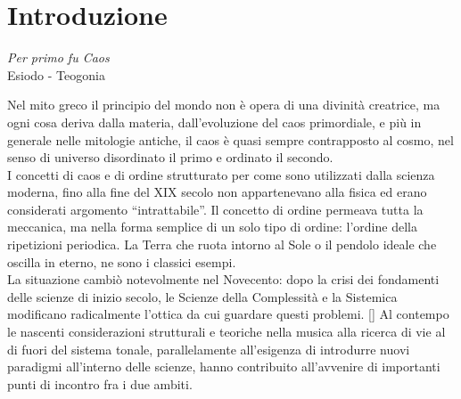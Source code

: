 \section{Introduzione}
\label{sec:Introduzione}

\begin{center}
\vspace{0.5cm}
\textit{Per primo fu Caos}
\\
Esiodo - Teogonia
\vspace{0.5cm}
\end{center}

Nel mito greco il principio del mondo non è opera di una divinità creatrice,
ma ogni cosa deriva dalla materia, dall’evoluzione del caos primordiale,
e più in generale nelle mitologie antiche, il caos è quasi sempre
contrapposto al cosmo, nel senso di universo disordinato il primo e ordinato
il secondo. \\
I concetti di caos e di ordine strutturato per come sono utilizzati dalla scienza moderna, fino alla fine del XIX secolo non appartenevano alla fisica ed erano considerati argomento “intrattabile”.
Il concetto di ordine permeava tutta la meccanica,
ma nella forma semplice di un solo tipo di ordine: l’ordine della ripetizioni periodica.
La Terra che ruota intorno al Sole o il pendolo ideale che oscilla in eterno, ne sono i classici esempi. \\
La situazione cambiò notevolmente nel Novecento:
dopo la crisi dei fondamenti delle scienze di inizio secolo,
le Scienze della Complessità e la Sistemica modificano radicalmente l’ottica da cui guardare questi problemi. [\cite{caosvillani}]
Al contempo le nascenti considerazioni strutturali e teoriche
nella musica alla ricerca di vie al di fuori del sistema tonale,
parallelamente all'esigenza di introdurre nuovi paradigmi all'interno delle scienze,
hanno contribuito all'avvenire di importanti
punti di incontro fra i due ambiti. \\

